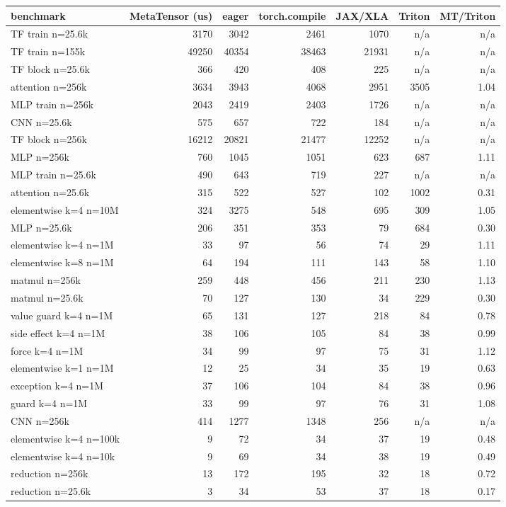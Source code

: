 \begin{tabular}{lrrrrrr}
\toprule
benchmark & MetaTensor (us) & eager & torch.compile & JAX/XLA & Triton & MT/Triton \\
\midrule
TF train n=25.6k & 3170 & 3042 & 2461 & 1070 & n/a & n/a \\
TF train n=155k & 49250 & 40354 & 38463 & 21931 & n/a & n/a \\
TF block n=25.6k & 366 & 420 & 408 & 225 & n/a & n/a \\
attention n=256k & 3634 & 3943 & 4068 & 2951 & 3505 & 1.04 \\
MLP train n=256k & 2043 & 2419 & 2403 & 1726 & n/a & n/a \\
CNN n=25.6k & 575 & 657 & 722 & 184 & n/a & n/a \\
TF block n=256k & 16212 & 20821 & 21477 & 12252 & n/a & n/a \\
MLP n=256k & 760 & 1045 & 1051 & 623 & 687 & 1.11 \\
MLP train n=25.6k & 490 & 643 & 719 & 227 & n/a & n/a \\
attention n=25.6k & 315 & 522 & 527 & 102 & 1002 & 0.31 \\
elementwise k=4 n=10M & 324 & 3275 & 548 & 695 & 309 & 1.05 \\
MLP n=25.6k & 206 & 351 & 353 & 79 & 684 & 0.30 \\
elementwise k=4 n=1M & 33 & 97 & 56 & 74 & 29 & 1.11 \\
elementwise k=8 n=1M & 64 & 194 & 111 & 143 & 58 & 1.10 \\
matmul n=256k & 259 & 448 & 456 & 211 & 230 & 1.13 \\
matmul n=25.6k & 70 & 127 & 130 & 34 & 229 & 0.30 \\
value guard k=4 n=1M & 65 & 131 & 127 & 218 & 84 & 0.78 \\
side effect k=4 n=1M & 38 & 106 & 105 & 84 & 38 & 0.99 \\
force k=4 n=1M & 34 & 99 & 97 & 75 & 31 & 1.12 \\
elementwise k=1 n=1M & 12 & 25 & 34 & 35 & 19 & 0.63 \\
exception k=4 n=1M & 37 & 106 & 104 & 84 & 38 & 0.96 \\
guard k=4 n=1M & 33 & 99 & 97 & 76 & 31 & 1.08 \\
CNN n=256k & 414 & 1277 & 1348 & 256 & n/a & n/a \\
elementwise k=4 n=100k & 9 & 72 & 34 & 37 & 19 & 0.48 \\
elementwise k=4 n=10k & 9 & 69 & 34 & 38 & 19 & 0.49 \\
reduction n=256k & 13 & 172 & 195 & 32 & 18 & 0.72 \\
reduction n=25.6k & 3 & 34 & 53 & 37 & 18 & 0.17 \\
\bottomrule
\end{tabular}
